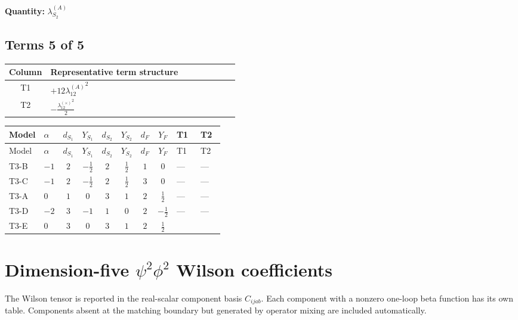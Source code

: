 \documentclass[8pt]{article}
\begin{document}
\begin{landscape}
\begin{longtable}{@{}llcccccc >{\raggedright\arraybackslash}p{0.21\linewidth} >{\raggedright\arraybackslash}p{0.21\linewidth} >{\raggedright\arraybackslash}p{0.21\linewidth}@{}}
\midrule
\bottomrule
\end{longtable}
\clearpage
\noindent\textbf{Quantity: }$\lambda_{S_2}^{(A)}$\par\smallskip
\subsection*{Terms 5 of 5}
\begin{center}
\begin{tabular}{@{}c >{\raggedright\arraybackslash}p{0.82\linewidth}@{}}
\toprule
Column & Representative term structure \\
\midrule
T1 & \(\displaystyle +12 {\lambda_{12}^{(A)}}^2\) \\
\midrule
T2 & \(\displaystyle -\frac{{\lambda_{12}^{(\times)}}^2}{2}\) \\
\midrule
\bottomrule
\end{tabular}
\end{center}
\smallskip
\tiny
\begin{longtable}{@{}llcccccc >{\raggedright\arraybackslash}p{0.21\linewidth} >{\raggedright\arraybackslash}p{0.21\linewidth}@{}}
\toprule
Model & $\alpha$ & $d_{S_1}$ & $Y_{S_1}$ & $d_{S_2}$ & $Y_{S_2}$ & $d_F$ & $Y_F$ & T1 & T2 \\
\midrule
\endfirsthead
\toprule
Model & $\alpha$ & $d_{S_1}$ & $Y_{S_1}$ & $d_{S_2}$ & $Y_{S_2}$ & $d_F$ & $Y_F$ & T1 & T2 \\
\midrule
\endhead
T3-B & $-1$ & $2$ & $-\frac{1}{2}$ & $2$ & $\frac{1}{2}$ & $1$ & $0$ & --- & --- \\
\midrule
T3-C & $-1$ & $2$ & $-\frac{1}{2}$ & $2$ & $\frac{1}{2}$ & $3$ & $0$ & --- & --- \\
\midrule
T3-A & $0$ & $1$ & $0$ & $3$ & $1$ & $2$ & $\frac{1}{2}$ & --- & --- \\
\midrule
T3-D & $-2$ & $3$ & $-1$ & $1$ & $0$ & $2$ & $-\frac{1}{2}$ & --- & --- \\
\midrule
T3-E & $0$ & $3$ & $0$ & $3$ & $1$ & $2$ & $\frac{1}{2}$ & \scriptsize\adjustbox{max width=\linewidth}{$\begin{gathered} +12 {\lambda_{12}^{(A)}}^2\end{gathered}$} & \scriptsize\adjustbox{max width=\linewidth}{$\begin{gathered} -\frac{{\lambda_{12}^{(\times)}}^2}{2}\end{gathered}$} \\
\midrule
\bottomrule
\end{longtable}
\clearpage
\section*{Dimension-five $\psi^2\phi^2$ Wilson coefficients}
The Wilson tensor is reported in the real-scalar component basis $C_{ijab}$. Each component with a nonzero one-loop beta function has its own table. Components absent at the matching boundary but generated by operator mixing are included automatically.

\end{landscape}
\end{document}
